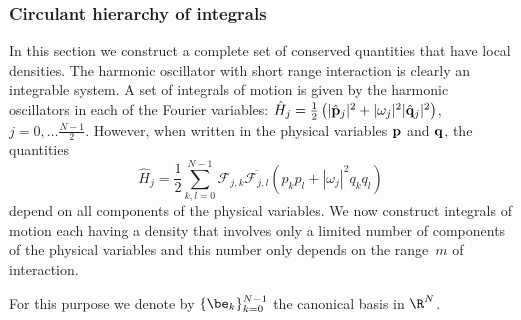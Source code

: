 {\subsubsection{Circulant hierarchy of integrals}
	In this section we construct a complete set of conserved quantities that have local densities.
	 The harmonic oscillator with short range interaction is clearly an integrable system. A  set of integrals of motion is given
	  by the harmonic oscillators in each of  the  Fourier variables:
$\hat{H}_j=\frac{1}{2}\left( |\hat{\bf{p}}_j| ^2 + |\omega_j|^2 |\hat{\bf{q}}_j|^2  \right)$,
$j=0,\dots \frac{N-1}{2}$.
However, when written in the physical variables ${\bf{p}}$ and $ {\bf{q}}$,  the quantities
$$\hat{H}_j=
 \frac{1}{2}\sum_{k,l=0}^{N-1} {\mathcal F}_{j,k} \overline{{\mathcal F}_{j,l} }( p_k  p_l+|\omega_j|^2 q_k q_l)$$  depend on all components of the physical variables.
We now construct integrals of motion each having a density that involves only a limited number of components of the physical variables and this number only depends on the range~$m$ of interaction.

	For this purpose we denote by $\{\be_k\}_{k=0}^{N-1}$  the canonical  basis in $\R^N$.
}
